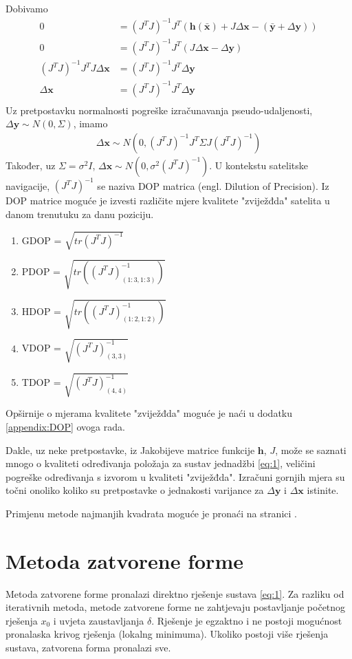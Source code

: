 \documentclass[a4paper,twoside,12pt]{memoir} %
\begin{document}
Dobivamo
\begin{align*}
0 &= (J^TJ)^{-1}J^T (\mathbf{h}(\bar{\mathbf{x}}) + J\Delta \mathbf{x} -(\bar{\mathbf{y}} + \Delta \mathbf{y}))\\
0 &= (J^TJ)^{-1}J^T (J\Delta \mathbf{x} - \Delta \mathbf{y})\\
(J^TJ)^{-1}J^T J\Delta \mathbf{x}& = (J^TJ)^{-1}J^T \Delta \mathbf{y}\\
\Delta \mathbf{x} &= (J^TJ)^{-1}J^T \Delta \mathbf{y}\\
\end{align*}
Uz pretpostavku normalnosti pogreške izračunavanja pseudo-udaljenosti,
\newline $\Delta \mathbf{y} \sim N(0,\Sigma)$, imamo
\begin{align}\label{eq:xerrorDistr}
	\Delta \mathbf{x} \sim N(0,(J^TJ)^{-1}J^T\Sigma J(J^TJ)^{-1})
\end{align}
Također, uz $\Sigma = \sigma^2I$, $\Delta \mathbf{x} \sim N(0,\sigma^2(J^TJ)^{-1})$.
U kontekstu satelitske navigacije, $(J^TJ)^{-1}$ se naziva DOP matrica (engl. Dilution of Precision).
Iz DOP matrice moguće je izvesti različite mjere kvalitete "zviježđda" satelita u danom trenutuku za danu poziciju.
\begin{enumerate}
	\item GDOP = $\sqrt{tr(J^TJ)^{-1}}$
	\item PDOP = $\sqrt{tr((J^TJ)^{-1}_{(1:3,1:3)})}$
	\item HDOP = $\sqrt{tr((J^TJ)^{-1}_{(1:2,1:2)})}$
	\item VDOP = $\sqrt{(J^TJ)^{-1}_{(3,3)}}$
	\item TDOP = $\sqrt{(J^TJ)^{-1}_{(4,4)}}$
\end{enumerate}
Opširnije o mjerama kvalitete "zviježđda" moguće je naći u dodatku \ref{appendix:DOP} ovoga rada.

Dakle, uz neke pretpostavke, iz Jakobijeve matrice funkcije $\mathbf{h}$, $J$, može se saznati mnogo o kvaliteti 
određivanja položaja za sustav jednadžbi \ref{eq:1}, veličini pogreške određivanja
s izvorom u kvaliteti "zviježđda".
Izračuni gornjih mjera su točni onoliko koliko su pretpostavke
o jednakosti varijance za $\Delta \mathbf{y}$ i $\Delta \mathbf{x}$
istinite.

Primjenu metode najmanjih kvadrata moguće je pronaći na stranici \pageref{stranica:nastavakLS}.
\section{Metoda zatvorene forme}
Metoda zatvorene forme pronalazi direktno rješenje sustava \ref{eq:1}.
Za razliku od iterativnih metoda,
metode zatvorene forme ne zahtjevaju postavljanje početnog rješenja $x_0$ i uvjeta zaustavljanja $\delta$. Rješenje je egzaktno i ne postoji mogućnost 
pronalaska krivog rješenja (lokalng minimuma). Ukoliko postoji više rješenja sustava, 
zatvorena forma pronalazi sve.
\end{document}
